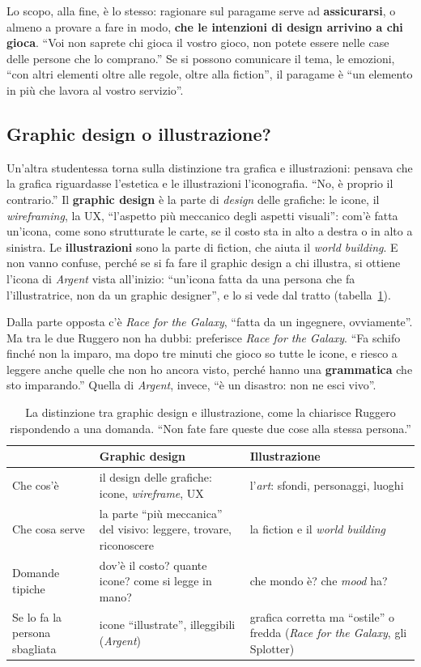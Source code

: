 Lo scopo, alla fine, è lo stesso: ragionare sul paragame serve ad
\textbf{assicurarsi}, o almeno a provare a fare in modo, \textbf{che le intenzioni di
design arrivino a chi gioca}. ``Voi non saprete chi gioca il vostro gioco, non potete
essere nelle case delle persone che lo comprano.'' Se si possono comunicare il tema, le
emozioni, ``con altri elementi oltre alle regole, oltre alla fiction'', il paragame è
``un elemento in più che lavora al vostro servizio''.

\subsection{Graphic design o illustrazione?}

Un'altra studentessa torna sulla distinzione tra grafica e illustrazioni: pensava che la
grafica riguardasse l'estetica e le illustrazioni l'iconografia. ``No, è proprio il
contrario.'' Il \textbf{graphic design} è la parte di \emph{design} delle grafiche: le
icone, il \emph{wireframing}, la UX, ``l'aspetto più meccanico degli aspetti visuali'':
com'è fatta un'icona, come sono strutturate le carte, se il costo sta in alto a destra o
in alto a sinistra. Le \textbf{illustrazioni} sono la parte di fiction, che aiuta il
\emph{world building}. E non vanno confuse, perché se si fa fare il graphic design a chi
illustra, si ottiene l'icona di \emph{Argent} vista all'inizio: ``un'icona fatta da una
persona che fa l'illustratrice, non da un graphic designer'', e lo si vede dal tratto
(tabella~\ref{a10:tab:grafica}).

Dalla parte opposta c'è \emph{Race for the Galaxy}, ``fatta da un ingegnere,
ovviamente''. Ma tra le due Ruggero non ha dubbi: preferisce \emph{Race for the Galaxy}.
``Fa schifo finché non la imparo, ma dopo tre minuti che gioco so tutte le icone, e
riesco a leggere anche quelle che non ho ancora visto, perché hanno una
\textbf{grammatica} che sto imparando.'' Quella di \emph{Argent}, invece, ``è un
disastro: non ne esci vivo''.

\begin{table}[htbp]
\centering
\small
\begin{tabular}{@{}p{2.8cm}p{5.2cm}p{5.2cm}@{}}
\toprule
 & \textbf{Graphic design} & \textbf{Illustrazione} \\
\midrule
Che cos'è & il design delle grafiche: icone, \emph{wireframe}, UX & l'\emph{art}:
sfondi, personaggi, luoghi \\
Che cosa serve & la parte ``più meccanica'' del visivo: leggere, trovare,
riconoscere & la fiction e il \emph{world building} \\
Domande tipiche & dov'è il costo? quante icone? come si legge in mano? & che mondo è?
che \emph{mood} ha? \\
Se lo fa la persona sbagliata & icone ``illustrate'', illeggibili (\emph{Argent}) &
grafica corretta ma ``ostile'' o fredda (\emph{Race for the Galaxy}, gli Splotter) \\
\bottomrule
\end{tabular}
\caption{La distinzione tra graphic design e illustrazione, come la chiarisce Ruggero
rispondendo a una domanda. ``Non fate fare queste due cose alla stessa persona.''}
\label{a10:tab:grafica}
\end{table}


